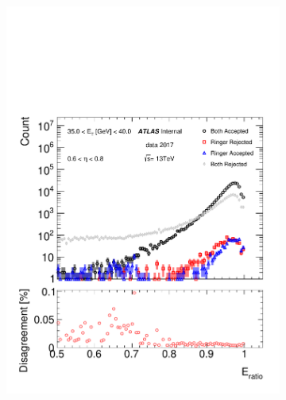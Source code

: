 \begin{figure}[h!]
\begin{subfigure}[c]{.49\textwidth}
\includegraphics[width=\textwidth]{sections/05_analysis/figures/quadrant_plots/eratio.pdf}
\caption{}
\end{subfigure}
\hfill
\begin{subfigure}[c]{.49\textwidth}
\centering

\end{subfigure}
\end{figure}
